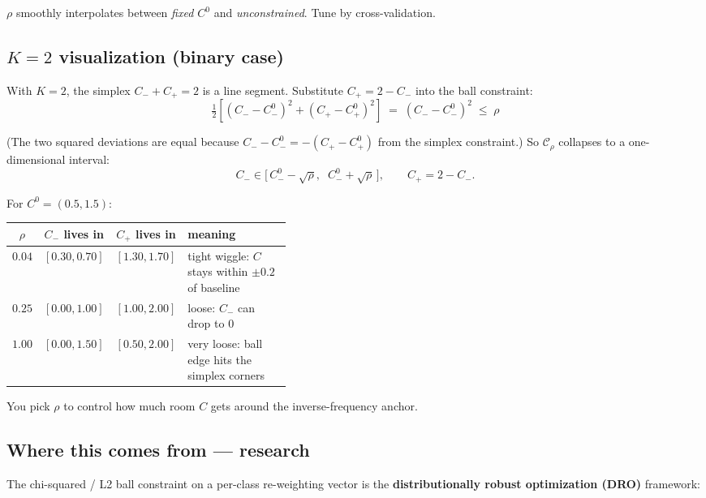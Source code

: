 \documentclass[11pt,a4paper]{article}
\begin{document}
$\rho$ smoothly interpolates between \emph{fixed $C^0$} and \emph{unconstrained}. Tune by cross-validation.

\subsection{$K = 2$ visualization (binary case)}

With $K = 2$, the simplex $C_- + C_+ = 2$ is a line segment. Substitute $C_+ = 2 - C_-$ into the ball constraint:
\[
\tfrac{1}{2}\!\left[(C_- - C_-^{0})^{2} + (C_+ - C_+^{0})^{2}\right] \;=\; (C_- - C_-^{0})^{2} \;\leq\; \rho
\]

(The two squared deviations are equal because $C_- - C_-^0 = -(C_+ - C_+^0)$ from the simplex constraint.) So $\mathcal{C}_\rho$ collapses to a one-dimensional interval:
\[
C_- \in \big[\,C_-^{0} - \sqrt{\rho},\;\;C_-^{0} + \sqrt{\rho}\,\big],\qquad C_+ = 2 - C_-.
\]

For $C^0 = (0.5, 1.5)$:

\begin{center}
\begin{tabular}{cccp{0.40\linewidth}}
\toprule
$\rho$ & $C_-$ lives in & $C_+$ lives in & meaning \\
\midrule
$0.04$ & $[0.30, 0.70]$ & $[1.30, 1.70]$ & tight wiggle: $C$ stays within $\pm 0.2$ of baseline \\
$0.25$ & $[0.00, 1.00]$ & $[1.00, 2.00]$ & loose: $C_-$ can drop to 0 \\
$1.00$ & $[0.00, 1.50]$ & $[0.50, 2.00]$ & very loose: ball edge hits the simplex corners \\
\bottomrule
\end{tabular}
\end{center}

You pick $\rho$ to control how much room $C$ gets around the inverse-frequency anchor.

\subsection{Where this comes from --- research}

The chi-squared / L2 ball constraint on a per-class re-weighting vector is the \textbf{distributionally robust optimization (DRO)} framework:
\end{document}
